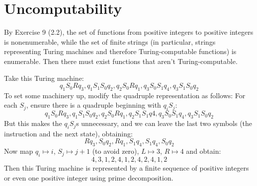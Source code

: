 \section{Uncomputability} %
\label{sec:uncomputability}
By Exercise 9 (2.2), the set of functions from positive integers to positive integers is nonenumerable, while the set of finite strings (in particular, strings representing Turing machines and therefore Turing-computable functions) is enumerable.
Then there must exist functions that aren't Turing-computable.

Take this Turing machine:
\begin{equation*}
  q_1S_0Rq_3, q_1S_1S_0q_2, q_2S_0Rq_1, q_3S_0S_1q_4, q_3S_1S_0q_2
\end{equation*}
To set some machinery up, modify the quadruple representation as follows: For each $S_j$, ensure there is a quadruple beginning with $q_iS_j$:
\begin{equation*}
  q_1S_0Rq_3, q_1S_1S_0q_2, q_2S_0Rq_1, q_2S_1S_1q4, q_3S_0S_1q_4, q_3S_1S_0q_2
\end{equation*}
But this makes the $q_iS_j$s unnecessary, and we can leave the last two symbols (the instruction and the next state), obtaining:
\begin{equation*}
  Rq_3, S_0q_2, Rq_1, S_1q_4, S_1q_4, S_0q_2
\end{equation*}
Now map $q_i \mapsto i$, $S_j \mapsto j+1$ (to avoid zero), $L \mapsto 3$, $R \mapsto 4$ and obtain:
\begin{equation*}
  4, 3, 1, 2, 4, 1, 2, 4, 2, 4, 1, 2
\end{equation*}
Then this Turing machine is represented by a finite sequence of positive integers or even one positive integer using prime decomposition.

